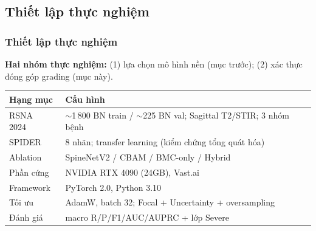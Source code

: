 \documentclass{beamer}
\numberwithin{figure}{section}
\numberwithin{table}{section}
\begin{document}
\subsection{Thiết lập thực nghiệm}
\begin{frame}
\frametitle{Thiết lập thực nghiệm}
{\footnotesize \textbf{Hai nhóm thực nghiệm:} (1) lựa chọn mô hình nền (mục trước); (2) xác thực đóng góp grading (mục này).}
\begin{table}
\centering
\renewcommand{\arraystretch}{1.3}
\small
\begin{tabular}{@{}l p{8.1cm}@{}}
\toprule
\textbf{Hạng mục} & \textbf{Cấu hình} \\
\midrule
RSNA 2024~\cite{rsna2024dataset} & $\sim$1\,800 BN train / $\sim$225 BN val; Sagittal T2/STIR; 3 nhóm bệnh \\
SPIDER~\cite{vansluijs2022spider} & 8 nhãn; transfer learning (kiểm chứng tổng quát hóa) \\
Ablation & SpineNetV2 / CBAM / BMC-only / Hybrid \\
Phần cứng & NVIDIA RTX 4090 (24GB), Vast.ai \\
Framework & PyTorch 2.0, Python 3.10 \\
Tối ưu & AdamW, batch 32; Focal + Uncertainty + oversampling \\
Đánh giá & macro R/P/F1/AUC/AUPRC + lớp Severe \\
\bottomrule
\end{tabular}
\end{table}
\end{frame}
\end{document}
